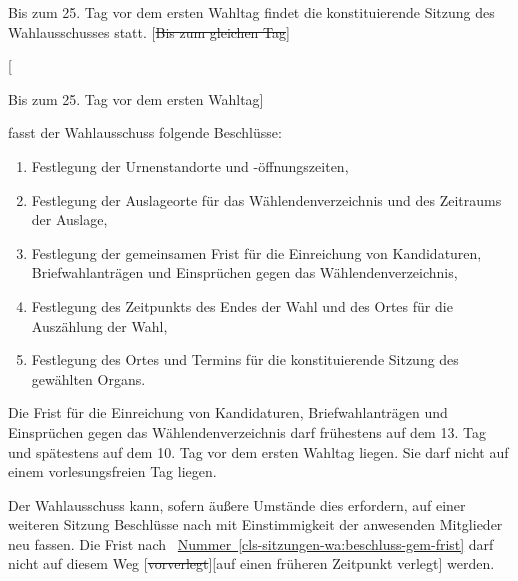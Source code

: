 \documentclass[%
draft,%
multilinesections%
]{fswo}
\newcommand\oldT[1]  {{\color{Gray}[\st{#1}]}}
\newcommand\newT[1]  {{\color{Green}[#1]}}
\newcommand\oldT[1]{}%
\newcommand\newT[1]{#1}
\newcommand\change[2]{\oldT{#1}\newT{#2}}
\newcommand*{\refItem}[1]{\hyperref[#1]{Nummer~\ref{#1}}}
\begin{document}
\begin{contract}
Bis zum 25. Tag vor dem ersten Wahltag findet die konstituierende Sitzung des Wahlausschusses statt.
\change{Bis zum gleichen Tag}{

Bis zum 25. Tag vor dem ersten Wahltag} fasst der Wahlausschuss folgende Beschlüsse:\label{cls-sitzungen-wa:abs-wichtige-beschluesse}
\begin{enumerate}
\item Festlegung der Urnenstandorte und -öffnungszeiten, \label{cls-sitzungen-wa:beschluss-urnen}
\item Festlegung der Auslageorte für das Wählendenverzeichnis und des Zeitraums der Auslage, \label{cls-sitzungen-wa:beschluss-auslage-verzeichnis}
\item Festlegung der gemeinsamen Frist für die Einreichung von Kandidaturen, Briefwahlanträgen und Einsprüchen gegen das Wählendenverzeichnis, \label{cls-sitzungen-wa:beschluss-gem-frist}
\item Festlegung des Zeitpunkts des Endes der Wahl und des Ortes für die Auszählung der Wahl, \label{cls-sitzungen-wa:beschluss-ende}
\item Festlegung des Ortes und Termins für die konstituierende Sitzung des gewählten Organs. \label{cls-sitzungen-wa:beschluss-konsti}
\end{enumerate}
Die Frist für die Einreichung von Kandidaturen, Briefwahlanträgen und Einsprüchen gegen das Wählendenverzeichnis darf frühestens auf dem 13. Tag und spätestens auf dem 10. Tag vor dem ersten Wahltag liegen.
Sie darf nicht auf einem vorlesungsfreien Tag liegen.


Der Wahlausschuss kann, sofern äußere Umstände dies erfordern, auf einer weiteren Sitzung Beschlüsse nach  mit Einstimmigkeit der anwesenden Mitglieder neu fassen.
Die Frist nach ~\refItem{cls-sitzungen-wa:beschluss-gem-frist} darf nicht auf diesem Weg \change{vorverlegt}{auf einen früheren Zeitpunkt verlegt} werden.


\end{contract}
\end{document}
